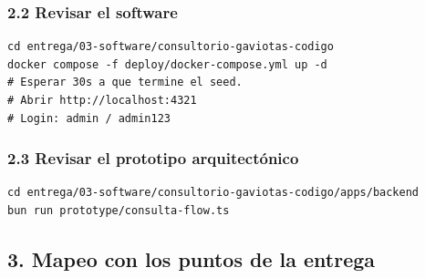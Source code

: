 \documentclass[11pt,letterpaper]{article}
\begin{document}
\subsubsection{2.2 Revisar el software}


\begin{lstlisting}
cd entrega/03-software/consultorio-gaviotas-codigo
docker compose -f deploy/docker-compose.yml up -d
# Esperar 30s a que termine el seed.
# Abrir http://localhost:4321
# Login: admin / admin123
\end{lstlisting}



\subsubsection{2.3 Revisar el prototipo arquitectónico}


\begin{lstlisting}
cd entrega/03-software/consultorio-gaviotas-codigo/apps/backend
bun run prototype/consulta-flow.ts
\end{lstlisting}



\hrulefill

\subsection{3. Mapeo con los puntos de la entrega}
\end{document}
